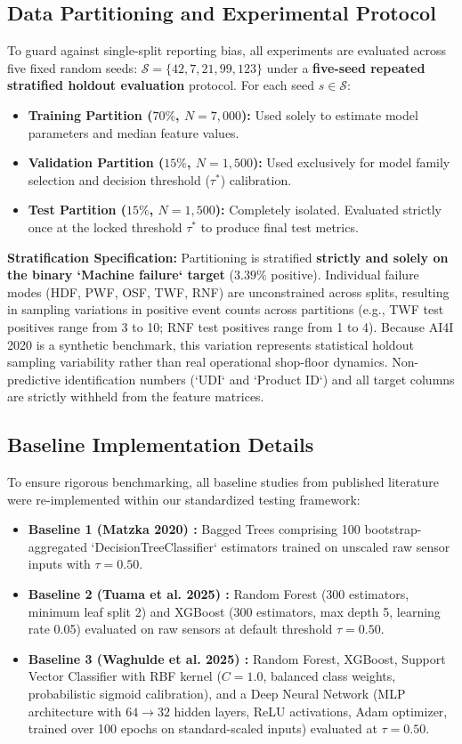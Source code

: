 \documentclass[conference]{IEEEtran}
\begin{document}
\subsection{Data Partitioning and Experimental Protocol}
To guard against single-split reporting bias, all experiments are evaluated across five fixed random seeds: $\mathcal{S} = \{42, 7, 21, 99, 123\}$ under a \textbf{five-seed repeated stratified holdout evaluation} protocol. For each seed $s \in \mathcal{S}$:
\begin{itemize}
    \item \textbf{Training Partition ($70\%$, $N=7,000$):} Used solely to estimate model parameters and median feature values.
    \item \textbf{Validation Partition ($15\%$, $N=1,500$):} Used exclusively for model family selection and decision threshold ($\tau^*$) calibration.
    \item \textbf{Test Partition ($15\%$, $N=1,500$):} Completely isolated. Evaluated strictly once at the locked threshold $\tau^*$ to produce final test metrics.
\end{itemize}
\textbf{Stratification Specification:} Partitioning is stratified \textbf{strictly and solely on the binary `Machine failure` target} ($3.39\%$ positive). Individual failure modes (HDF, PWF, OSF, TWF, RNF) are unconstrained across splits, resulting in sampling variations in positive event counts across partitions (e.g., TWF test positives range from 3 to 10; RNF test positives range from 1 to 4). Because AI4I 2020 is a synthetic benchmark, this variation represents statistical holdout sampling variability rather than real operational shop-floor dynamics. Non-predictive identification numbers (`UDI` and `Product ID`) and all target columns are strictly withheld from the feature matrices.

\subsection{Baseline Implementation Details}
To ensure rigorous benchmarking, all baseline studies from published literature were re-implemented within our standardized testing framework:
\begin{itemize}
    \item \textbf{Baseline 1 (Matzka 2020) \cite{b5}:} Bagged Trees comprising 100 bootstrap-aggregated `DecisionTreeClassifier` estimators trained on unscaled raw sensor inputs with $\tau = 0.50$.
    \item \textbf{Baseline 2 (Tuama et al. 2025) \cite{b6}:} Random Forest (300 estimators, minimum leaf split 2) and XGBoost (300 estimators, max depth 5, learning rate 0.05) evaluated on raw sensors at default threshold $\tau = 0.50$.
    \item \textbf{Baseline 3 (Waghulde et al. 2025) \cite{b10}:} Random Forest, XGBoost, Support Vector Classifier with RBF kernel ($C=1.0$, balanced class weights, probabilistic sigmoid calibration), and a Deep Neural Network (MLP architecture with $64 \rightarrow 32$ hidden layers, ReLU activations, Adam optimizer, trained over 100 epochs on standard-scaled inputs) evaluated at $\tau = 0.50$.
\end{itemize}
\end{document}
